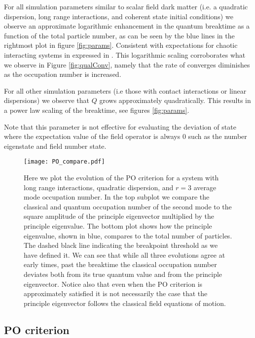 \documentclass[aps,prd,twocolumn,superscriptaddress]{revtex4-1}
\begin{document}
For all simulation parameters similar to scalar field dark matter (i.e. a quadratic dispersion, long range interactions, and coherent state initial conditions) we observe an approximate logarithmic enhancement in the quantum breaktime as a function of the total particle number, as can be seen by the blue lines in the rightmost plot in figure \ref{fig:params}. Consistent with expectations for chaotic interacting systems in expressed in \cite{Hertzberg2016}. This logarithmic scaling corroborates what we observe in Figure \ref{fig:qualConv}, namely that the rate of converges diminishes as the occupation number is increased.

For all other simulation parameters (i.e those with contact interactions or linear dispersions) we observe that $Q$ grows approximately quadratically. This results in a power law scaling of the breaktime, see figures \ref{fig:params}. 

Note that this parameter is not effective for evaluating the deviation of state where the expectation value of the field operator is always $0$ such as the number eigenstate and field number state. 

\begin{figure}
	\texttt{[image: PO\_compare.pdf]}
	\caption{ Here we plot the evolution of the PO criterion for a system with long range interactions, quadratic dispersion, and $r=3$ average mode occupation number. In the top subplot we compare the classical and quantum occupation number of the second mode to the square amplitude of the principle eigenvector multiplied by the principle eigenvalue. The bottom plot shows how the principle eigenvalue, shown in blue, compares to the total number of particles. The dashed black line indicating the breakpoint threshold as we have defined it. We can see that while all three evolutions agree at early times, past the breaktime the classical occupation number deviates both from its true quantum value and from the principle eigenvector. Notice also that even when the PO criterion is approximately satisfied it is not necessarily the case that the principle eigenvector follows the classical field equations of motion. }
	\label{fig:POparam}
\end{figure}

\subsection{PO criterion}

\begin{comment}
\begin{figure}
	\texttt{[image: all\_PO.pdf]}
	\caption{ Here we show the breaktime as defined by the PO criterion for each test problem and a number of different total occupation numbers. Nonzero interaction constants are given, solid points represent coherent state initial conditions and x markers field number state initial conditions. We can see that there is an approximate logarithmic enhancement in the breaktime as a function of the total number of particles for each system.  }
	\label{fig:POparam}
\end{figure}
\end{comment}
\end{document}
